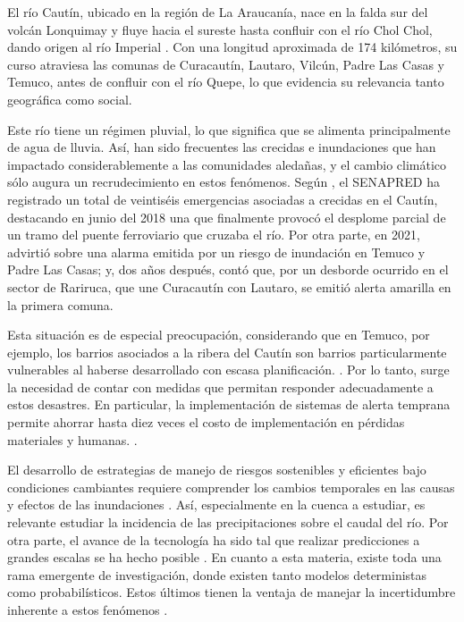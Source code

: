 \documentclass[hess, manuscript]{copernicus}
\begin{document}

\introduction[Introducción]  %
\label{sec:Introduction}

El río Cautín, ubicado en la región de La Araucanía, nace en la falda sur del volcán Lonquimay y fluye hacia el sureste hasta confluir con el río Chol Chol, dando origen al río Imperial \citep{richard_cerda_respuesta_2014}. Con una longitud aproximada de 174 kilómetros, su curso atraviesa las comunas de Curacautín, Lautaro, Vilcún, Padre Las Casas y Temuco, antes de confluir con el río Quepe, lo que evidencia su relevancia tanto geográfica como social.

Este río tiene un régimen pluvial, lo que significa que se alimenta principalmente de agua de lluvia. Así, han sido frecuentes las crecidas e inundaciones que han impactado considerablemente a las comunidades aledañas, y el cambio climático sólo augura un recrudecimiento en estos fenómenos. Según \citet{padilla_turra_registros_2024}, el SENAPRED ha registrado un total de veintiséis emergencias asociadas a crecidas en el Cautín, destacando en junio del 2018 una que finalmente provocó el desplome parcial de un tramo del puente ferroviario que cruzaba el río. Por otra parte, en 2021, \citet{el_mostrador_intendencia_2021} advirtió sobre una alarma emitida por un riesgo de inundación en Temuco y Padre Las Casas; y, dos años después, \citet{mennickent_barros_desbordes_2023} contó que, por un desborde ocurrido en el sector de Rariruca, que une Curacautín con Lautaro, se emitió alerta amarilla en la primera comuna.

Esta situación es de especial preocupación, considerando que en Temuco, por ejemplo, los barrios asociados a la ribera del Cautín son barrios particularmente vulnerables al haberse desarrollado con escasa planificación. \citep{acuna_munoz_volver_2020}. Por lo tanto, surge la necesidad de contar con medidas que permitan responder adecuadamente a estos desastres. En particular, la implementación de sistemas de alerta temprana permite ahorrar hasta diez veces el costo de implementación en pérdidas materiales y humanas. \citep{global_commission_on_adaptation_adapt_nodate}.

El desarrollo de estrategias de manejo de riesgos sostenibles y eficientes bajo condiciones cambiantes requiere comprender los cambios temporales en las causas y efectos de las inundaciones \citep{kreibich_panta_2023}. Así, especialmente en la cuenca a estudiar, es relevante estudiar la incidencia de las precipitaciones sobre el caudal del río. Por otra parte, el avance de la tecnología ha sido tal que realizar predicciones a grandes escalas se ha hecho posible \citep{arnal_towards_2025}. En cuanto a esta materia, existe toda una rama emergente de investigación, donde existen tanto modelos deterministas como probabilísticos. Estos últimos tienen la ventaja de manejar la incertidumbre inherente a estos fenómenos \citep{wakai_historical_2025}.
\end{document}
